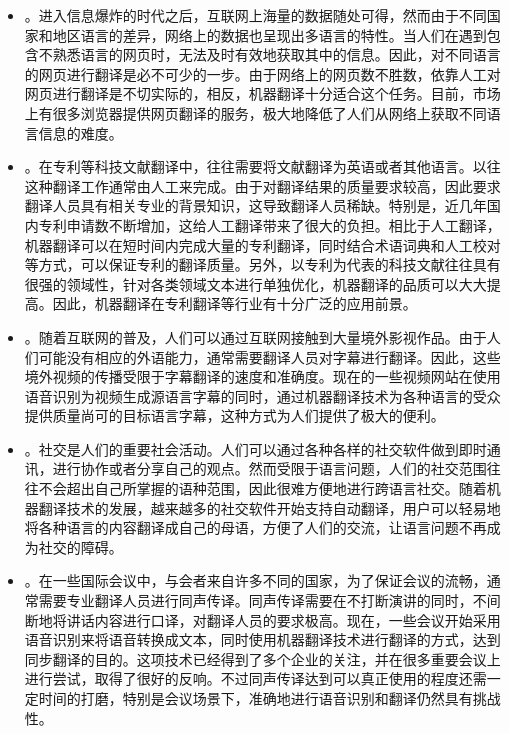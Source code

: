 \begin{itemize} 
\item {\small{}}。进入信息爆炸的时代之后，互联网上海量的数据随处可得，然而由于不同国家和地区语言的差异，网络上的数据也呈现出多语言的特性。当人们在遇到包含不熟悉语言的网页时，无法及时有效地获取其中的信息。因此，对不同语言的网页进行翻译是必不可少的一步。由于网络上的网页数不胜数，依靠人工对网页进行翻译是不切实际的，相反，机器翻译十分适合这个任务。目前，市场上有很多浏览器提供网页翻译的服务，极大地降低了人们从网络上获取不同语言信息的难度。

\item {\small{}}。在专利等科技文献翻译中，往往需要将文献翻译为英语或者其他语言。以往这种翻译工作通常由人工来完成。由于对翻译结果的质量要求较高，因此要求翻译人员具有相关专业的背景知识，这导致翻译人员稀缺。特别是，近几年国内专利申请数不断增加，这给人工翻译带来了很大的负担。相比于人工翻译，机器翻译可以在短时间内完成大量的专利翻译，同时结合术语词典和人工校对等方式，可以保证专利的翻译质量。另外，以专利为代表的科技文献往往具有很强的领域性，针对各类领域文本进行单独优化，机器翻译的品质可以大大提高。因此，机器翻译在专利翻译等行业有十分广泛的应用前景。

\item {\small{}}。随着互联网的普及，人们可以通过互联网接触到大量境外影视作品。由于人们可能没有相应的外语能力，通常需要翻译人员对字幕进行翻译。因此，这些境外视频的传播受限于字幕翻译的速度和准确度。现在的一些视频网站在使用语音识别为视频生成源语言字幕的同时，通过机器翻译技术为各种语言的受众提供质量尚可的目标语言字幕，这种方式为人们提供了极大的便利。

\item {\small{}}。社交是人们的重要社会活动。人们可以通过各种各样的社交软件做到即时通讯，进行协作或者分享自己的观点。然而受限于语言问题，人们的社交范围往往不会超出自己所掌握的语种范围，因此很难方便地进行跨语言社交。随着机器翻译技术的发展，越来越多的社交软件开始支持自动翻译，用户可以轻易地将各种语言的内容翻译成自己的母语，方便了人们的交流，让语言问题不再成为社交的障碍。

\item {\small{}}。在一些国际会议中，与会者来自许多不同的国家，为了保证会议的流畅，通常需要专业翻译人员进行同声传译。同声传译需要在不打断演讲的同时，不间断地将讲话内容进行口译，对翻译人员的要求极高。现在，一些会议开始采用语音识别来将语音转换成文本，同时使用机器翻译技术进行翻译的方式，达到同步翻译的目的。这项技术已经得到了多个企业的关注，并在很多重要会议上进行尝试，取得了很好的反响。不过同声传译达到可以真正使用的程度还需一定时间的打磨，特别是会议场景下，准确地进行语音识别和翻译仍然具有挑战性。


\end{itemize}
